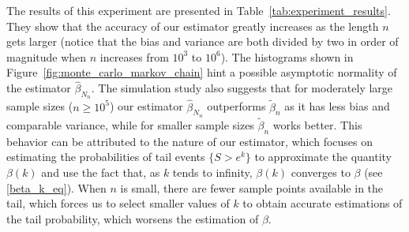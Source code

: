 \documentclass[sn-mathphys-ay]{sn-jnl}%
\begin{document}
The results of this experiment are presented in Table~\ref{tab:experiment_results}.
They show that the accuracy of our estimator greatly increases as the length \(n\) gets larger (notice
that the bias and variance are both divided by two in order of magnitude when \(n\) increases from
\(10^3\) to \(10^6\)). The histograms shown in Figure~\ref{fig:monte_carlo_markov_chain}
hint a possible asymptotic normality of the estimator $\widehat{\beta}_{N_{n}}$.
The simulation study also suggests that for moderately large sample sizes ($n\geq 10^5$) our estimator
$\widehat{\beta}_{N_{n}}$ outperforms \(\widetilde{\beta}_n\) as it has less bias
and comparable variance, while for smaller sample sizes \(\widetilde{\beta}_n\) works better.
This behavior can be attributed to the nature of our estimator, which focuses on
estimating the probabilities of tail events \(\{S > e^k\}\) to approximate the quantity
\(\beta(k)\) and use the fact that, as \(k\) tends to infinity, \(\beta(k)\) converges to
\(\beta\) (see \eqref{beta_k_eq}). When \(n\) is small, there
are fewer sample points available in the tail, which forces us to select smaller values
of \(k\) to obtain accurate estimations of the tail probability, which worsens the
estimation of \(\beta\).
\end{document}
